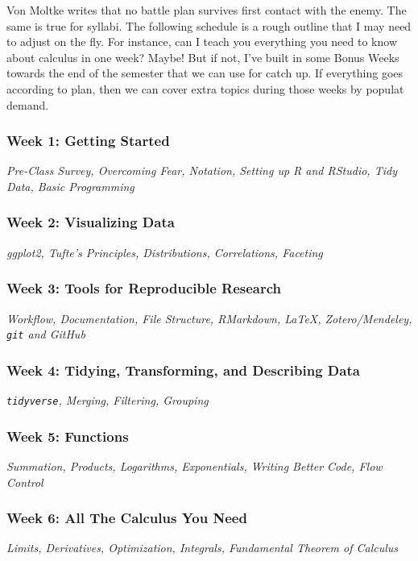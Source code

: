 \documentclass[11pt, letterpaper]{article}
\begin{document}
Von Moltke writes that no battle plan survives first contact with the enemy. The same is true for syllabi. The following schedule is a rough outline that I may need to adjust on the fly. For instance, can I teach you everything you need to know about calculus in one week? Maybe! But if not, I've built in some Bonus Weeks towards the end of the semester that we can use for catch up. If everything goes according to plan, then we can cover extra topics during those weeks by populat demand.

\subsubsection*{Week 1: Getting Started}
\textit{Pre-Class Survey, Overcoming Fear, Notation, Setting up R and RStudio, Tidy Data, Basic Programming}

\subsubsection*{Week 2: Visualizing Data}
\textit{ggplot2, Tufte's Principles, Distributions, Correlations, Faceting}

\subsubsection*{Week 3: Tools for Reproducible Research}
\textit{Workflow, Documentation, File Structure, RMarkdown, \LaTeX, Zotero/Mendeley, \texttt{git} and GitHub}

\subsubsection*{Week 4: Tidying, Transforming, and Describing Data}
\textit{\texttt{tidyverse}, Merging, Filtering, Grouping}

\subsubsection*{Week 5: Functions}
\textit{Summation, Products, Logarithms, Exponentials, Writing Better Code, Flow Control}

\subsubsection*{Week 6: All The Calculus You Need}
\textit{Limits, Derivatives, Optimization, Integrals, Fundamental Theorem of Calculus}
\end{document}
